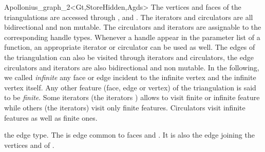 \begin{ccRefClass}{Apollonius_graph_2<Gt,StoreHidden,Agds>}
The vertices and faces of the triangulations are accessed through 
, 
 and . 
The iterators and circulators
are all bidirectional and non mutable.
The circulators and iterators are assignable to the 
corresponding handle types. Whenever a handle appear in the parameter 
list of a function, an appropriate iterator or circulator can be used as well.
The edges of the triangulation can also be visited through iterators
and circulators,
the edge circulators and iterators
are also bidirectional and non mutable.
In the following, we called {\it infinite} any face or edge 
incident  to the infinite vertex and the infinite vertex itself.
 Any other feature (face, edge or vertex) of the triangulation is said 
to be {\it finite}.
Some iterators (the  iterators ) allows to visit finite or 
infinite feature while others (the  iterators) visit only
finite features. Circulators visit infinite features as well as finite 
ones.

%
 {the edge type.
The  is edge common to faces  and 
. It is also the edge joining the vertices
 and  of .}
%
{}
%
\ccGlue
{}
\ccGlue
{}
\ccGlue
{}
\ccGlue
{}
\ccGlue
{}
\ccGlue
{}
\ccGlue
{}
\ccGlue
{}
\ccGlue
{}
\ccGlue
{}
\ccGlue
{}



\end{ccRefClass}
